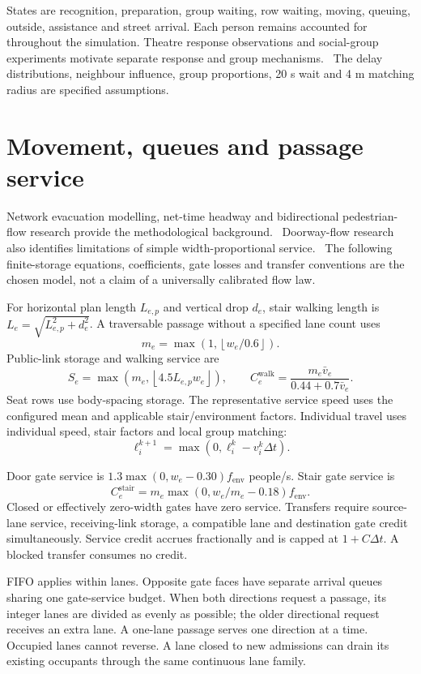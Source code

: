 \documentclass[11pt,a4paper]{article}
\begin{document}
States are recognition, preparation, group waiting, row waiting, moving, queuing, outside, assistance and street arrival. Each person remains accounted for throughout the simulation. Theatre response observations and social-group experiments motivate separate response and group mechanisms.~\cite{galea2017theatre,bode} The delay distributions, neighbour influence, group proportions, 20 s wait and 4 m matching radius are specified assumptions.~\cite{model,implementation}

\section{Movement, queues and passage service}
Network evacuation modelling, net-time headway and bidirectional pedestrian-flow research provide the methodological background.~\cite{spearpoint,johansson,feliciani2018} Doorway-flow research also identifies limitations of simple width-proportional service.~\cite{gwynne} The following finite-storage equations, coefficients, gate losses and transfer conventions are the chosen model, not a claim of a universally calibrated flow law.~\cite{model,implementation}

For horizontal plan length $L_{e,p}$ and vertical drop $d_e$, stair walking length is $L_e=\sqrt{L_{e,p}^2+d_e^2}$. A traversable passage without a specified lane count uses
\[
m_e=\max\!\left(1,\left\lfloor w_e/0.6\right\rfloor\right).
\]
Public-link storage and walking service are
\[
S_e=\max\!\left(m_e,\left\lfloor4.5L_{e,p}w_e\right\rfloor\right),
\qquad C_e^{\mathrm{walk}}=\frac{m_e\bar v_e}{0.44+0.7\bar v_e}.
\]
Seat rows use body-spacing storage. The representative service speed uses the configured mean and applicable stair/environment factors. Individual travel uses individual speed, stair factors and local group matching:
\[
\ell_i^{k+1}=\max(0,\ell_i^k-v_i^k\Delta t).
\]

Door gate service is $1.3\max(0,w_e-0.30)f_{\mathrm{env}}$ people/s. Stair gate service is
\[
C_e^{\mathrm{stair}}=m_e\max(0,w_e/m_e-0.18)f_{\mathrm{env}}.
\]
Closed or effectively zero-width gates have zero service. Transfers require source-lane service, receiving-link storage, a compatible lane and destination gate credit simultaneously. Service credit accrues fractionally and is capped at $1+C\Delta t$. A blocked transfer consumes no credit.

FIFO applies within lanes. Opposite gate faces have separate arrival queues sharing one gate-service budget. When both directions request a passage, its integer lanes are divided as evenly as possible; the older directional request receives an extra lane. A one-lane passage serves one direction at a time. Occupied lanes cannot reverse. A lane closed to new admissions can drain its existing occupants through the same continuous lane family.
\end{document}
